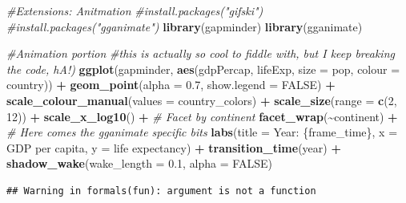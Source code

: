 \documentclass[
]{article}
\newenvironment{Shaded}{\begin{snugshade}}{\end{snugshade}}
\newcommand{\AttributeTok}[1]{\textcolor[rgb]{0.13,0.29,0.53}{#1}}
\newcommand{\CommentTok}[1]{\textcolor[rgb]{0.56,0.35,0.01}{\textit{#1}}}
\newcommand{\ConstantTok}[1]{\textcolor[rgb]{0.56,0.35,0.01}{#1}}
\newcommand{\DecValTok}[1]{\textcolor[rgb]{0.00,0.00,0.81}{#1}}
\newcommand{\FloatTok}[1]{\textcolor[rgb]{0.00,0.00,0.81}{#1}}
\newcommand{\FunctionTok}[1]{\textcolor[rgb]{0.13,0.29,0.53}{\textbf{#1}}}
\newcommand{\NormalTok}[1]{#1}
\newcommand{\SpecialCharTok}[1]{\textcolor[rgb]{0.81,0.36,0.00}{\textbf{#1}}}
\newcommand{\StringTok}[1]{\textcolor[rgb]{0.31,0.60,0.02}{#1}}
\begin{document}
\begin{Shaded}
\begin{Highlighting}[]
\CommentTok{\#Extensions: Anitmation }
\CommentTok{\#install.packages("gifski")}
\CommentTok{\#install.packages("gganimate")}
\FunctionTok{library}\NormalTok{(gapminder)}
\FunctionTok{library}\NormalTok{(gganimate)}

\CommentTok{\#Animation portion}
\CommentTok{\#this is actually so cool to fiddle with, but I keep breaking the code, hA!)}
\FunctionTok{ggplot}\NormalTok{(gapminder, }\FunctionTok{aes}\NormalTok{(gdpPercap, lifeExp, }\AttributeTok{size =}\NormalTok{ pop, }\AttributeTok{colour =}\NormalTok{ country)) }\SpecialCharTok{+}
  \FunctionTok{geom\_point}\NormalTok{(}\AttributeTok{alpha =} \FloatTok{0.7}\NormalTok{, }\AttributeTok{show.legend =} \ConstantTok{FALSE}\NormalTok{) }\SpecialCharTok{+}
  \FunctionTok{scale\_colour\_manual}\NormalTok{(}\AttributeTok{values =}\NormalTok{ country\_colors) }\SpecialCharTok{+}
  \FunctionTok{scale\_size}\NormalTok{(}\AttributeTok{range =} \FunctionTok{c}\NormalTok{(}\DecValTok{2}\NormalTok{, }\DecValTok{12}\NormalTok{)) }\SpecialCharTok{+}
  \FunctionTok{scale\_x\_log10}\NormalTok{() }\SpecialCharTok{+}
  \CommentTok{\# Facet by continent}
  \FunctionTok{facet\_wrap}\NormalTok{(}\SpecialCharTok{\textasciitilde{}}\NormalTok{continent) }\SpecialCharTok{+}
  \CommentTok{\# Here comes the gganimate specific bits}
  \FunctionTok{labs}\NormalTok{(}\AttributeTok{title =} \StringTok{\textquotesingle{}Year: \{frame\_time\}\textquotesingle{}}\NormalTok{, }\AttributeTok{x =} \StringTok{\textquotesingle{}GDP per capita\textquotesingle{}}\NormalTok{, }\AttributeTok{y =} \StringTok{\textquotesingle{}life expectancy\textquotesingle{}}\NormalTok{) }\SpecialCharTok{+}
  \FunctionTok{transition\_time}\NormalTok{(year) }\SpecialCharTok{+}
  \FunctionTok{shadow\_wake}\NormalTok{(}\AttributeTok{wake\_length =} \FloatTok{0.1}\NormalTok{, }\AttributeTok{alpha =} \ConstantTok{FALSE}\NormalTok{)}
\end{Highlighting}
\end{Shaded}

\begin{verbatim}
## Warning in formals(fun): argument is not a function
\end{verbatim}
\end{document}

